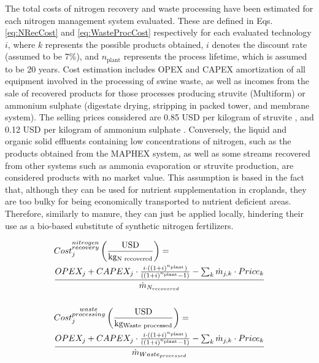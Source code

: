 \begin{refsection}[referencesCh6]
The total costs of nitrogen recovery and waste processing have been estimated for each nitrogen management system evaluated. These are defined in Eqs. \ref{eq:NRecCost} and \ref{eq:WasteProcCost} respectively for each evaluated technology $i$, where $k$ represents the possible products obtained, $i$ denotes the discount rate (assumed to be 7\%), and $n_{\text{plant}}$ represents the process lifetime, which is assumed to be 20 years. Cost estimation includes OPEX and CAPEX amortization of all equipment involved in the processing of swine waste, as well as incomes from the sale of recovered products for those processes producing struvite (Multiform) or ammonium sulphate (digestate drying, stripping in packed tower, and membrane system). 
The selling prices considered are 0.85 USD per kilogram of struvite \citep{molinos2011economic}, and 0.12 USD per kilogram of ammonium sulphate \citep{AmmoniumSulphatePrice}. Conversely, the liquid and organic solid effluents containing low concentrations of nitrogen, such as the products obtained from the MAPHEX system, as well as some streams recovered from other systems such as ammonia evaporation or struvite production, are considered products with no market value. This assumption is based in the fact that, although they can be used for nutrient supplementation in croplands, they are too bulky for being economically transported to nutrient deficient areas. Therefore, similarly to manure, they can just be applied locally, hindering their use as a bio-based substitute of synthetic nitrogen fertilizers.

\begin{align}
& Cost_{j}^{\substack{nitrogen\\recovery}} \left(\frac{\text{USD}}{\text{kg\textsubscript{N recovered}}}\right) = \nonumber \\
& \frac{OPEX_{j}+CAPEX_{j} \cdot \frac{i \cdot \left( \left(1+i\right)^{n_{\text{plant}}} \right)}{\left( \left( 1+i\right)^{n_{\text{plant}}} -1 \right) } -\sum_{k}{\dot{m}_{j,k} \cdot Price_{k}}}{{\dot{m}_{N_{recovered}}}} \label{eq:NRecCost} \\
\nonumber \\
& Cost_{j}^ {\substack{waste\\processing}} \left(\frac{\text{USD}}{\text{kg\textsubscript{Waste processed}}}\right) = \nonumber \\
& \frac{OPEX_{j}+CAPEX_{j} \cdot \frac{i \cdot \left( \left(1+i\right)^{n_{\text{plant}}} \right)}{\left( \left( 1+i\right)^{n_{\text{plant}}} -1 \right) } -\sum_{k}{\dot{m}_{j,k} \cdot Price_{k}}}{\dot{m}_{Waste_{processed}}} \label{eq:WasteProcCost}
\end{align}


\end{refsection}
